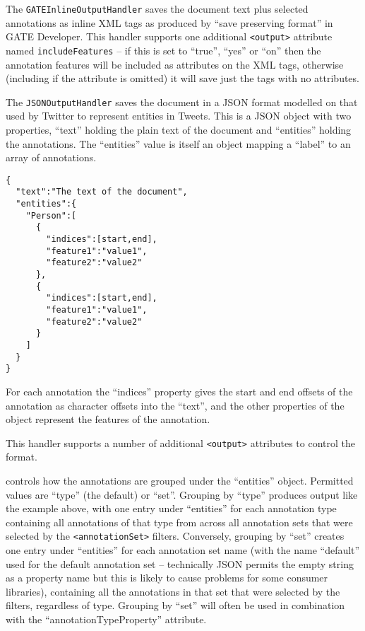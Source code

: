 The \verb!GATEInlineOutputHandler! saves the document text plus selected
annotations as inline XML tags as produced by ``save preserving format'' in
GATE Developer.  This handler supports one additional \verb!<output>! attribute
named \verb!includeFeatures! -- if this is set to ``true'', ``yes'' or ``on''
then the annotation features will be included as attributes on the XML tags,
otherwise (including if the attribute is omitted) it will save just the tags
with no attributes.

The \verb!JSONOutputHandler! saves the document in a JSON format modelled on
that used by Twitter to represent entities in Tweets.  This is a JSON object
with two properties, ``text'' holding the plain text of the document and
``entities'' holding the annotations.  The ``entities'' value is itself an
object mapping a ``label'' to an array of annotations.
%
\begin{verbatim}
{
  "text":"The text of the document",
  "entities":{
    "Person":[
      {
        "indices":[start,end],
        "feature1":"value1",
        "feature2":"value2"
      },
      {
        "indices":[start,end],
        "feature1":"value1",
        "feature2":"value2"
      }
    ]
  }
}
\end{verbatim}

For each annotation the ``indices'' property gives the start and end offsets of
the annotation as character offsets into the ``text'', and the other properties
of the object represent the features of the annotation.

This handler supports a number of additional \verb!<output>! attributes to
control the format.

\bde
\item[groupEntitiesBy] controls how the annotations are grouped under the
  ``entities'' object.  Permitted values are ``type'' (the default) or ``set''.
  Grouping by ``type'' produces output like the example above, with one entry
  under ``entities'' for each annotation type containing all annotations of
  that type from across all annotation sets that were selected by the
  \verb!<annotationSet>! filters.  Conversely, grouping by ``set'' creates one
  entry under ``entities'' for each annotation set name (with the name
  ``default'' used for the default annotation set -- technically JSON
  permits the empty string as a property name but this is likely to cause
  problems for some consumer libraries), containing all the annotations in
  that set that were selected by the filters, regardless of type.  Grouping by
  ``set'' will often be used in combination with the ``annotationTypeProperty''
  attribute.

